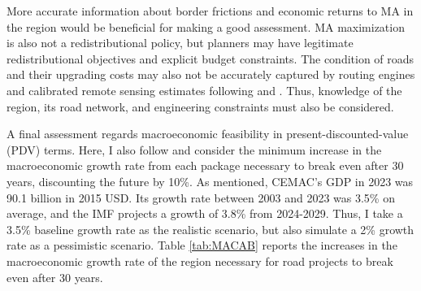 \documentclass[a4paper]{article}
\begin{document}
More accurate information about border frictions and economic returns to MA in the region would be beneficial for making a good assessment. MA maximization is also not a redistributional policy, but planners may have legitimate redistributional objectives and explicit budget constraints. The condition of roads and their upgrading costs may also not be accurately captured by routing engines and calibrated remote sensing estimates following \citet{collier2016cost} and \citet{fajgelbaum2020optimal}. Thus, knowledge of the region, its road network, and engineering constraints must also be considered. \newline 

A final assessment regards macroeconomic feasibility in present-discounted-value (PDV) terms. Here, I also follow \citet{krantz2024optimal} and consider the minimum increase in the macroeconomic growth rate from each package necessary to break even after 30 years, discounting the future by 10\%. As mentioned, CEMAC's GDP in 2023 was 90.1 billion in 2015 USD. Its growth rate between 2003 and 2023 was 3.5\% on average, and the IMF projects a growth of 3.8\% from 2024-2029. Thus, I take a 3.5\% baseline growth rate as the realistic scenario, but also simulate a 2\% growth rate as a pessimistic scenario. Table \ref{tab:MACAB} reports the increases in the macroeconomic growth rate of the region necessary for road projects to break even after 30 years. 
\end{document}
